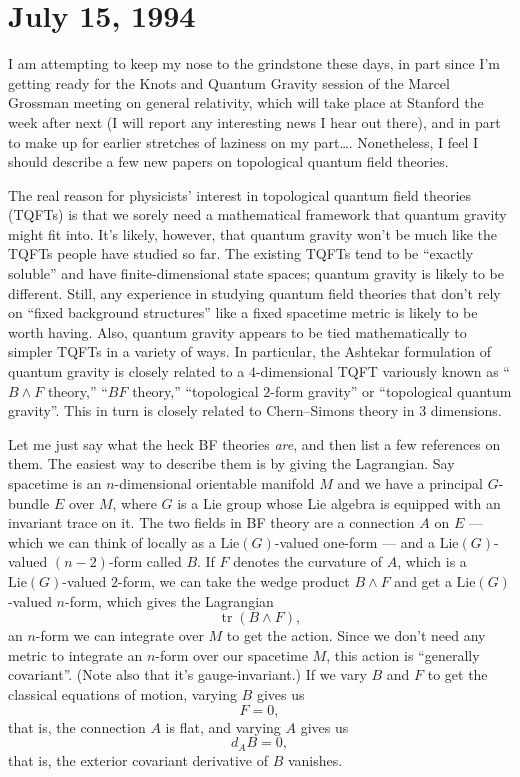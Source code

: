 \documentclass[12pt]{article}
\begin{document}
\hypertarget{week36}{%
\section{July 15, 1994}\label{week36}}

I am attempting to keep my nose to the grindstone these days, in part
since I'm getting ready for the Knots and Quantum Gravity session of the
Marcel Grossman meeting on general relativity, which will take place at
Stanford the week after next (I will report any interesting news I hear
out there), and in part to make up for earlier stretches of laziness on
my part\ldots. Nonetheless, I feel I should describe a few new papers on
topological quantum field theories.

The real reason for physicists' interest in topological quantum field
theories (TQFTs) is that we sorely need a mathematical framework that
quantum gravity might fit into. It's likely, however, that quantum
gravity won't be much like the TQFTs people have studied so far. The
existing TQFTs tend to be ``exactly soluble'' and have
finite-dimensional state spaces; quantum gravity is likely to be
different. Still, any experience in studying quantum field theories that
don't rely on ``fixed background structures'' like a fixed spacetime
metric is likely to be worth having. Also, quantum gravity appears to be
tied mathematically to simpler TQFTs in a variety of ways. In
particular, the Ashtekar formulation of quantum gravity is closely
related to a \(4\)-dimensional TQFT variously known as ``\(B \wedge F\)
theory,'' ``\(BF\) theory,'' ``topological \(2\)-form gravity'' or
``topological quantum gravity''. This in turn is closely related to
Chern--Simons theory in 3 dimensions.

Let me just say what the heck BF theories \emph{are}, and then list a
few references on them. The easiest way to describe them is by giving
the Lagrangian. Say spacetime is an \(n\)-dimensional orientable
manifold \(M\) and we have a principal \(G\)-bundle \(E\) over \(M\),
where \(G\) is a Lie group whose Lie algebra is equipped with an
invariant trace on it. The two fields in BF theory are a connection
\(A\) on \(E\) --- which we can think of locally as a
\(\mathrm{Lie}(G)\)-valued one-form --- and a \(\mathrm{Lie}(G)\)-valued
\((n-2)\)-form called \(B\). If \(F\) denotes the curvature of \(A\),
which is a \(\mathrm{Lie}(G)\)-valued \(2\)-form, we can take the wedge
product \(B\wedge F\) and get a \(\mathrm{Lie}(G)\)-valued \(n\)-form,
which gives the Lagrangian \[\operatorname{tr}(B \wedge F),\] an
\(n\)-form we can integrate over \(M\) to get the action. Since we don't
need any metric to integrate an \(n\)-form over our spacetime \(M\),
this action is ``generally covariant''. (Note also that it's
gauge-invariant.) If we vary \(B\) and \(F\) to get the classical
equations of motion, varying \(B\) gives us \[F = 0,\] that is, the
connection \(A\) is flat, and varying \(A\) gives us \[d_A B = 0,\] that
is, the exterior covariant derivative of \(B\) vanishes.
\end{document}

